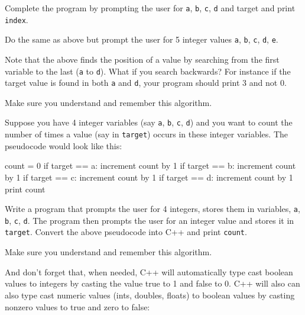 \begin{ex}
Complete the program by prompting the user for
\texttt{a}, \texttt{b}, \texttt{c}, \texttt{d} and target and print
\texttt{index}.
\end{ex}
\begin{ex}
Do the same as above but prompt the user for 5
integer values \texttt{a}, \texttt{b}, \texttt{c}, \texttt{d}, \texttt{e}.
\end{ex}
\begin{ex}
Note that the above finds the position of a value by
searching from the first variable to the last (\texttt{a} to \texttt{d}).
What if you search backwards? For instance if the target value is found
in both \texttt{a} and \texttt{d}, your program should print 3 and not 0.
\end{ex}

Make sure you understand and remember this algorithm.

\newpage{}

Suppose you have 4 integer variables (say \texttt{a}, \texttt{b}, \texttt{c},
\texttt{d}) and you want to count the number of times a value (say in
\texttt{target}) occurs in these integer variables. The pseudocode would
look like this:\\
\begin{console}
count = 0
if target == a:
   increment count by 1
if target == b:
   increment count by 1
if target == c:
   increment count by 1
if target == d:
   increment count by 1
print count 
\end{console}

\begin{ex}
Write a program that prompts the user for 4 integers,
stores them in variables, \texttt{a}, \texttt{b}, \texttt{c}, \texttt{d}. The
program then prompts the user for an integer value and stores it in
\texttt{target}. Convert the above pseudocode into C++ and print
\texttt{count}.
\end{ex}

Make sure you understand and remember this algorithm.

\newpage{}

And don't forget that, when needed, C++ will
automatically type cast boolean values to integers by casting the value
true to 1 and false to 0. C++ will also can also type cast numeric
values (ints, doubles, floats) to boolean values by casting nonzero
values to true and zero to false:

